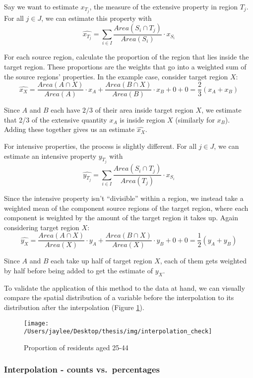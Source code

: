 \documentclass[12pt,twoside]{reedthesis}
\begin{document}
Say we want to estimate \(x_{T_j}\), the measure of the extensive property in region \(T_j\). For all \(j \in J\), we can estimate this property with
\[
\widehat{x_{T_j}} = \sum_{i \in I} \frac{Area(S_i \cap T_j)}{Area(S_i)} \cdot x_{S_i}
\]

For each source region, calculate the proportion of the region that lies inside the target region. These proportions are the weights that go into a weighted sum of the source regions' properties. In the example case, consider target region \(X\):
\[
\widehat{x_X} = \frac{Area(A \cap X)}{Area(A)} \cdot x_{A} + \frac{Area(B \cap X)}{Area(B)} \cdot x_{B} + 0 + 0 = \frac{2}{3}(x_A + x_B)
\]

Since \(A\) and \(B\) each have \(2/3\) of their area inside target region \(X\), we estimate that 2/3 of the extensive quantity \(x_A\) is inside region \(X\) (similarly for \(x_B\)). Adding these together gives us an estimate \(\widehat{x_X}\).

For intensive properties, the process is slightly different. For all \(j \in J\), we can estimate an intensive property \(y_{T_j}\) with
\[
\widehat{y_{T_j}} = \sum_{i \in I} \frac{Area(S_i \cap T_j)}{Area(T_j)} \cdot x_{S_i}
\]

Since the intensive property isn't ``divisible'' within a region, we instead take a weighted mean of the component source regions of the target region, where each component is weighted by the amount of the target region it takes up. Again considering target region \(X\):
\[
\widehat{y_X} = \frac{Area(A \cap X)}{Area(X)} \cdot y_{A} + \frac{Area(B \cap X)}{Area(X)} \cdot y_{B} + 0 + 0 = \frac{1}{2}(y_A + y_B)
\]

Since \(A\) and \(B\) each take up half of target region \(X\), each of them gets weighted by half before being added to get the estimate of \(y_X\).

To validate the application of this method to the data at hand, we can visually compare the spatial distribution of a variable before the interpolation to its distribution after the interpolation (Figure \ref{fig:interp-check}).
\begin{figure}
\texttt{[image: /Users/jaylee/Desktop/thesis/img/interpolation\_check]} \caption{Proportion of residents aged 25-44}\label{fig:interp-check}
\end{figure}
\hypertarget{interpolation---counts-vs.-percentages}{%
\subsubsection{Interpolation - counts vs.~percentages}\label{interpolation---counts-vs.-percentages}}
\end{document}
